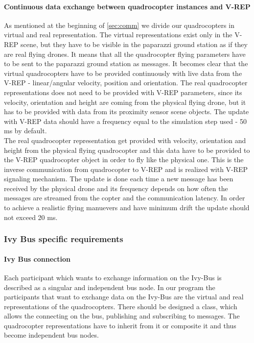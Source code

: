 \paragraph{Continuous data exchange between quadrocopter instances and V-REP}

As mentioned at the beginning of \ref{sec:comm} we divide our quadrocopters in virtual and real representation. The virtual representations exist only in the V-REP scene, but they have to be visible in the paparazzi ground station as if they are real flying drones. It means that all the quadrocopter flying parameters have to be sent to the paparazzi ground station as messages. It becomes clear that the virtual quadrocopters have to be provided continuously with live data from the V-REP - linear/angular velocity, position and orientation. The real quadrocopter representations does not need to be provided with V-REP parameters, since its velocity, orientation and height are coming from the physical flying drone, but it has to be provided with data from its proximity sensor scene objects. The update with V-REP data should have a frequency equal to the simulation step used - 50 ms by default.\\
The real quadrocopter representation get provided with velocity, orientation and height from the physical flying quadrocopter and this data have to be provided to the V-REP quadrocopter object in order to fly like the physical one. This is the inverse communication from quadrocopter to V-REP and is realized with V-REP signaling mechanism. The update is done each time a new message has been received by the physical drone and its frequency depends on how often the messages are streamed from the copter and the communication latency. In order to achieve a realistic flying manuevers and have minimum drift the update should not exceed 20 ms.

\subsubsection{Ivy Bus specific requirements}
\label{sec:requirementsIVYBus}
\paragraph{Ivy Bus connection}
Each participant which wants to exchange information on the Ivy-Bus is described as a singular and independent bus node. In our program the participants that want to exchange data on the Ivy-Bus are the virtual and real representations of the quadrocopters. There should be designed a class, which allows the connecting on the bus, publishing and subscribing to messages. The quadrocopter representations have to inherit from it or composite it and thus become independent bus nodes.

